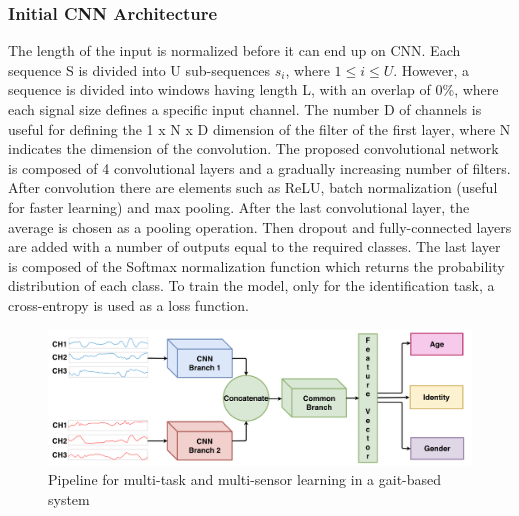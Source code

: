 \subsubsection{Initial CNN Architecture}
The length of the input is normalized before it can end up on CNN. Each 
sequence S is divided into U sub-sequences $ s_i $, where $ 1 \leq i \leq U $. However, 
a sequence is divided into windows having length L, with an overlap of 0\%, 
where each signal size defines a specific input channel. The number D of 
channels is useful for defining the 1 x N x D dimension of the filter of the 
first layer, where N indicates the dimension of the convolution. The proposed 
convolutional network is composed of 4 convolutional layers and a gradually 
increasing number of filters. After convolution there are elements such as 
ReLU, batch normalization (useful for faster learning) and max pooling. After 
the last convolutional layer, the average is chosen as a pooling operation. 
Then dropout and fully-connected layers are added with a number of outputs 
equal to the required classes. The last layer is composed of the Softmax 
normalization function which returns the probability distribution of each class. 
To train the model, only for the identification task, a cross-entropy is used 
as a loss function.
\begin{figure}[htbp]
    \centering
    \includegraphics[width = 1 \linewidth]{images/paper5/architecture.png}
    \centering
    \caption{Pipeline for multi-task and multi-sensor learning in a gait-based system}
    \label{fig:pipeline}
\end{figure}

